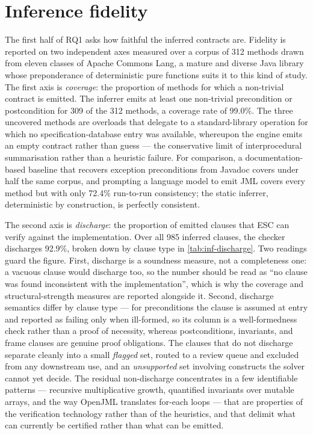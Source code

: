 \section{Inference fidelity}
\label{sec:inf-fidelity}

The first half of RQ1 asks how faithful the inferred contracts are. Fidelity is
reported on two independent axes measured over a corpus of 312 methods drawn from
eleven classes of Apache Commons Lang, a mature and diverse Java library whose
preponderance of deterministic pure functions suits it to this kind of study. The
first axis is \emph{coverage}: the proportion of methods for which a non-trivial
contract is emitted. The inferrer emits at least one non-trivial precondition or
postcondition for 309 of the 312 methods, a coverage rate of 99.0\%. The three
uncovered methods are overloads that delegate to a standard-library operation for
which no specification-database entry was available, whereupon the engine emits an
empty contract rather than guess --- the conservative limit of interprocedural
summarisation rather than a heuristic failure. For comparison, a documentation-based
baseline that recovers exception preconditions from Javadoc covers under half the
same corpus, and prompting a language model to emit JML covers every method but
with only 72.4\% run-to-run consistency; the static inferrer, deterministic by
construction, is perfectly consistent.

The second axis is \emph{discharge}: the proportion of emitted clauses that ESC can
verify against the implementation. Over all 985 inferred clauses, the checker
discharges 92.9\%, broken down by clause type in \cref{tab:inf-discharge}. Two
readings guard the figure. First, discharge is a soundness measure, not a
completeness one: a vacuous clause would discharge too, so the number should be read
as ``no clause was found inconsistent with the implementation'', which is why the
coverage and structural-strength measures are reported alongside it. Second,
discharge semantics differ by clause type --- for preconditions the clause is
assumed at entry and reported as failing only when ill-formed, so its column is a
well-formedness check rather than a proof of necessity, whereas postconditions,
invariants, and frame clauses are genuine proof obligations. The clauses that do not
discharge separate cleanly into a small \emph{flagged} set, routed to a review queue
and excluded from any downstream use, and an \emph{unsupported} set involving
constructs the solver cannot yet decide. The residual non-discharge concentrates in
a few identifiable patterns --- recursive multiplicative growth, quantified
invariants over mutable arrays, and the way OpenJML translates for-each loops ---
that are properties of the verification technology rather than of the heuristics,
and that delimit what can currently be certified rather than what can be emitted.

